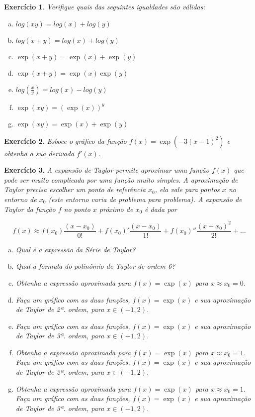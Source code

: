 \documentclass[letter,11pt]{article}
\newtheorem{exer}{Exercício}
\begin{document}
\medskip
\begin{exer} \rm
Verifique quais das seguintes igualdades são válidas:
  \begin{enumerate}[a)]
    \item $log(xy) = log(x) + log(y)$
    \item $log(x+y)=log(x)+log(y)$
    \item $\exp(x+y)=\exp(x) + \exp(y)$
    \item $\exp(x+y)=\exp(x)\exp(y)$
    \item $log(\frac{x}{y})=log(x)-log(y)$
    \item $\exp(xy)=(\exp(x))^y$
    \item $\exp(xy)=\exp(x)+\exp(y)$
  \end{enumerate}
\end{exer}


\medskip
\begin{exer} \rm
Esboce o gráfico da função $f(x) =\exp(-3(x-1)^2)$ e obtenha a sua derivada $f'(x)$.
\end{exer}


\medskip
\begin{exer} \rm
A expansão de Taylor permite aproximar uma função $f(x)$ que pode ser muito complicada por uma função muito simples. A aproximação de Taylor precisa escolher um ponto de referência
$x_0$, ela vale para pontos $x$ no entorno de $x_0$ (este entorno varia de problema para problema). A expansão de Taylor da função $f$ no ponto $x$ próximo de $x_0$ é dada por

$$
f(x) \approx f(x_0)\frac{(x-x_0)}{0!} + f(x_0)'\frac{(x-x_0)}{1!}+ f(x_0)''\frac{(x-x_0)^2}{2!}+ \ldots
$$

  \begin{enumerate}[a)]
    \item Qual é a expressão da Série de Taylor?
    \item Qual a fórmula do polinômio de Taylor de ordem 6?
    \item Obtenha a expressão aproximada para $f(x) = \exp(x)$ para $x \approx x_0 = 0$.
    \item Faça um gráfico com as duas funções, $f(x)=\exp(x)$ e sua aproximação de Taylor de 2ª. ordem, para $x \in  (-1, 2)$.
    \item Faça um gráfico com as duas funções, $f(x)=\exp(x)$ e sua aproximação de Taylor de 3ª. ordem, para $x \in  (-1, 2)$.
    \item Obtenha a expressão aproximada para $f(x) = \exp(x)$ para $x \approx x_0 = 1$. Faça um gráfico com as duas funções, $f(x)=\exp(x)$ e sua aproximação de Taylor de 2ª. ordem, para $x \in  (-1, 2)$.
    \item Obtenha a expressão aproximada para $f(x) = \exp(x)$ para $x \approx x_0 = 1$. Faça um gráfico com as duas funções, $f(x)=\exp(x)$ e sua aproximação de Taylor de 3ª. ordem, para $x \in  (-1, 2)$.
\end{enumerate}
\end{exer}
\end{document}

